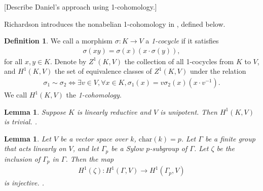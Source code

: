 \documentclass[12pt]{amsart}
\numberwithin{equation}{section}
\newtheorem{lem}[equation]{Lemma}
\theoremstyle{definition}
\newtheorem{defn}[equation]{Definition}
\theoremstyle{remark}
\theoremstyle{remark}
\begin{document}
[Describe Daniel's approach using 1-cohomology.]

Richardson introduces the nonabelian 1-cohomology in \cite{richardson1982orbits}, defined below.

\begin{defn} We call a morphism $\sigma:K\rightarrow V$ a \emph{1-cocycle} if it satisfies
\begin{align*}
  \sigma(xy) = \sigma(x) (x\cdot\sigma(y)),
  \label{eqn:na_z}
\end{align*}
for all $x, y \in K$. Denote by $Z^1\left( K, V \right)$ the collection of all 1-cocycles from $K$ to $V$, and $H^1(K, V)$ the set of equivalence classes of $Z^1(K, V)$ under the relation
\begin{align*}
\sigma_1 \sim \sigma_2 \Leftrightarrow \exists v \in V,\forall x \in K, \sigma_1(x) = v\sigma_2(x)(x \cdot v^{-1}).
\end{align*}
We call $H^1(K, V)$ the \emph{1-cohomology}.
\end{defn}

\begin{lem}
  Suppose $K$ is linearly reductive and $V$ is unipotent. Then $H^1(K, V)$ is trivial. \cite[Lemma 6.2.6]{richardson1982orbits}.
  \label{lem:nonab_lin_red}
\end{lem}

\begin{lem} \label{brown}
Let $V$ be a vector space over $k$, $\mathrm{char}(k) = p$. Let $\Gamma$ be a finite group that acts linearly on $V$, and let $\Gamma_p$ be a \emph{Sylow $p$-subgroup} of $\Gamma$. Let $\zeta$ be the inclusion of $\Gamma_p$ in $\Gamma$. Then the map 
\begin{align*}
H^1(\zeta):H^1(\Gamma, V)\rightarrow H^1(\Gamma_p, V)
\end{align*}
is injective. \cite[III.10.4 Prop.]{brown1982cohomology}.
\end{lem}
\end{document}
